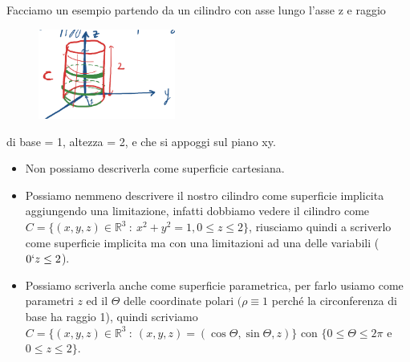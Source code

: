 \begin{example}
Facciamo un esempio partendo da un cilindro con asse lungo l'asse z e raggio
\end{example}
\begin{figure}
    \vspace{-5pt}
    \centering
    \includegraphics[width=4.5cm]{images/ess-legamu-defi.png}
\end{figure}
\hspace{-15pt}di base = 1, altezza = 2, e che si appoggi sul piano xy. 
\begin{itemize}
    \item Non possiamo descriverla come superficie cartesiana.
    \item Possiamo nemmeno descrivere il nostro cilindro come superficie implicita aggiungendo una limitazione, infatti dobbiamo vedere il cilindro come $C = \{(x,y,z) \in \mathbb{R}^3 \::\: x^2 + y^2 = 1, 0\leq z \leq 2\}$, riusciamo quindi a scriverlo come superficie implicita ma con una limitazioni ad una delle variabili ($0\lq z \leq 2$).
\end{itemize} 
\newpage
\begin{itemize}
    \item Possiamo scriverla anche come superficie parametrica, per farlo usiamo come parametri $z$ ed il $\Theta$ delle coordinate polari $(\rho \equiv 1$ perché la circonferenza di base ha raggio 1), quindi scriviamo $C = \{(x,y,z) \in \mathbb{R}^3 \::\: (x,y,z) = (\cos{\Theta}, \sin{\Theta}, z)\}$ con $\{0 \leq \Theta \leq 2\pi$ e $0\leq z \leq 2\}$.
\end{itemize}


